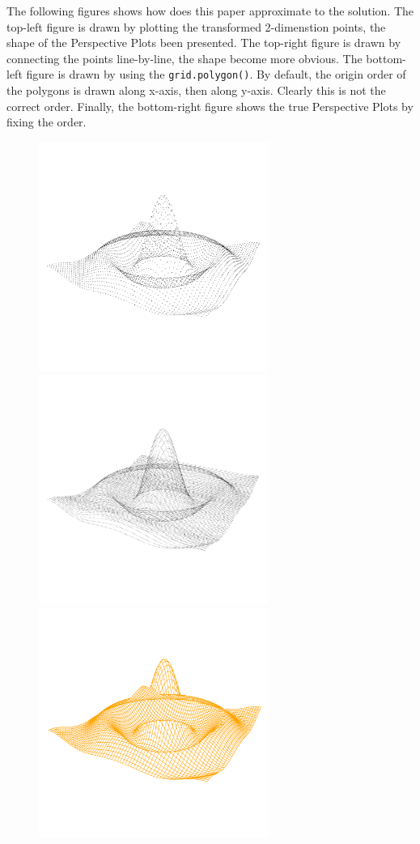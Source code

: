 \documentclass[paper=a4, fontsize=11pt]{report}
\begin{document}
The following figures shows how does this paper approximate to the solution. The top-left figure is drawn by plotting the transformed 2-dimenstion points, the shape of the Perspective Plots been presented. The top-right figure is drawn by connecting the points line-by-line, the shape become more obvious. The bottom-left figure is drawn by using the \texttt{grid.polygon()}. By default, the origin order of the polygons is drawn along x-axis, then along y-axis. Clearly this is not the correct order. Finally, the bottom-right figure shows the true Perspective Plots by fixing the order. 
\newpage
\begin{figure}[h]
\begin{center}
  \includegraphics[height = 7.5cm, width = 7.5cm]{figure/standalone_p_1.pdf}
  \includegraphics[height = 7.5cm, width = 7.5cm]{figure/standalone_p_2.pdf}
  \includegraphics[height = 7.5cm, width = 7.5cm]{figure/standalone_p_3.pdf}

\end{center}
\end{figure}
\end{document}
